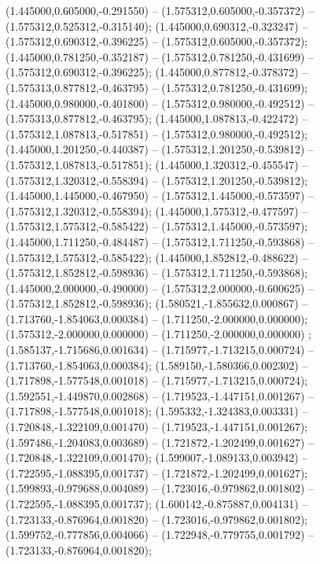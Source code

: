  (1.445000,0.605000,-0.291550) -- (1.575312,0.605000,-0.357372) -- (1.575312,0.525312,-0.315140);
 (1.445000,0.690312,-0.323247) -- (1.575312,0.690312,-0.396225) -- (1.575312,0.605000,-0.357372);
 (1.445000,0.781250,-0.352187) -- (1.575312,0.781250,-0.431699) -- (1.575312,0.690312,-0.396225);
 (1.445000,0.877812,-0.378372) -- (1.575313,0.877812,-0.463795) -- (1.575312,0.781250,-0.431699);
 (1.445000,0.980000,-0.401800) -- (1.575312,0.980000,-0.492512) -- (1.575313,0.877812,-0.463795);
 (1.445000,1.087813,-0.422472) -- (1.575312,1.087813,-0.517851) -- (1.575312,0.980000,-0.492512);
 (1.445000,1.201250,-0.440387) -- (1.575312,1.201250,-0.539812) -- (1.575312,1.087813,-0.517851);
 (1.445000,1.320312,-0.455547) -- (1.575312,1.320312,-0.558394) -- (1.575312,1.201250,-0.539812);
 (1.445000,1.445000,-0.467950) -- (1.575312,1.445000,-0.573597) -- (1.575312,1.320312,-0.558394);
 (1.445000,1.575312,-0.477597) -- (1.575312,1.575312,-0.585422) -- (1.575312,1.445000,-0.573597);
 (1.445000,1.711250,-0.484487) -- (1.575312,1.711250,-0.593868) -- (1.575312,1.575312,-0.585422);
 (1.445000,1.852812,-0.488622) -- (1.575312,1.852812,-0.598936) -- (1.575312,1.711250,-0.593868);
 (1.445000,2.000000,-0.490000) -- (1.575312,2.000000,-0.600625) -- (1.575312,1.852812,-0.598936);
 (1.580521,-1.855632,0.000867) -- (1.713760,-1.854063,0.000384) -- (1.711250,-2.000000,0.000000);
 (1.575312,-2.000000,0.000000) -- (1.711250,-2.000000,0.000000) ;
 (1.585137,-1.715686,0.001634) -- (1.715977,-1.713215,0.000724) -- (1.713760,-1.854063,0.000384);
 (1.589150,-1.580366,0.002302) -- (1.717898,-1.577548,0.001018) -- (1.715977,-1.713215,0.000724);
 (1.592551,-1.449870,0.002868) -- (1.719523,-1.447151,0.001267) -- (1.717898,-1.577548,0.001018);
 (1.595332,-1.324383,0.003331) -- (1.720848,-1.322109,0.001470) -- (1.719523,-1.447151,0.001267);
 (1.597486,-1.204083,0.003689) -- (1.721872,-1.202499,0.001627) -- (1.720848,-1.322109,0.001470);
 (1.599007,-1.089133,0.003942) -- (1.722595,-1.088395,0.001737) -- (1.721872,-1.202499,0.001627);
 (1.599893,-0.979688,0.004089) -- (1.723016,-0.979862,0.001802) -- (1.722595,-1.088395,0.001737);
 (1.600142,-0.875887,0.004131) -- (1.723133,-0.876964,0.001820) -- (1.723016,-0.979862,0.001802);
 (1.599752,-0.777856,0.004066) -- (1.722948,-0.779755,0.001792) -- (1.723133,-0.876964,0.001820);
